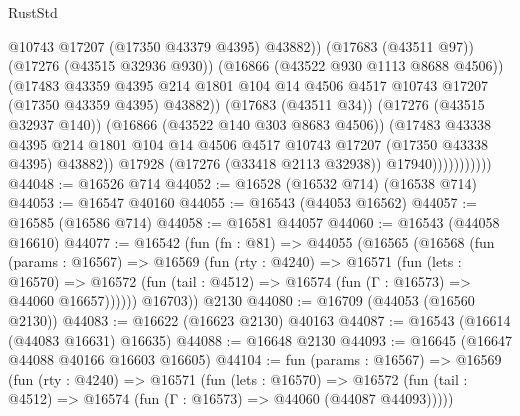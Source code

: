 \begin{lexlean}{RustStd}
\begin{coremodule}
                                  @10743
                                  @17207
                                  (@17350 @43379 @4395)
                                  @43882))
                              (@17683 (@43511 @97))
                              (@17276 (@43515 @32936 @930))
                              (@16866 (@43522 @930 @1113 @8688 @4506))
                              (@17483
                                @43359
                                @4395
                                @214
                                @1801
                                @104
                                @14
                                @4506
                                @4517
                                @10743
                                @17207
                                (@17350 @43359 @4395)
                                @43882))
                            (@17683 (@43511 @34))
                            (@17276 (@43515 @32937 @140))
                            (@16866 (@43522 @140 @303 @8683 @4506))
                            (@17483
                              @43338
                              @4395
                              @214
                              @1801
                              @104
                              @14
                              @4506
                              @4517
                              @10743
                              @17207
                              (@17350 @43338 @4395)
                              @43882))
                          @17928
                          (@17276 (@33418 @2113 @32938))
                          @17940)))))))))))
@44048 := @16526 @714
@44052 := @16528 (@16532 @714) (@16538 @714)
@44053 := @16547 @40160
@44055 := @16543 (@44053 @16562)
@44057 := @16585 (@16586 @714)
@44058 := @16581 @44057
@44060 := @16543 (@44058 @16610)
@44077 := @16542
    (fun (fn : @81) =>
    @44055
      (@16565
        (@16568
          (fun (params : @16567) =>
          @16569
            (fun (rty : @4240) =>
            @16571
              (fun (lets : @16570) =>
              @16572 (fun (tail : @4512) => @16574 (fun (Γ : @16573) => @44060 @16657))))))
        @16703))
    @2130
@44080 := @16709 (@44053 (@16560 @2130))
@44083 := @16622 (@16623 @2130) @40163
@44087 := @16543 (@16614 (@44083 @16631) @16635)
@44088 := @16648 @2130
@44093 := @16645 (@16647 @44088 @40166 @16603 @16605)
@44104 := fun (params : @16567) =>
  @16569
    (fun (rty : @4240) =>
    @16571
      (fun (lets : @16570) =>
      @16572 (fun (tail : @4512) => @16574 (fun (Γ : @16573) => @44060 (@44087 @44093)))))

\end{coremodule}
\end{lexlean}
